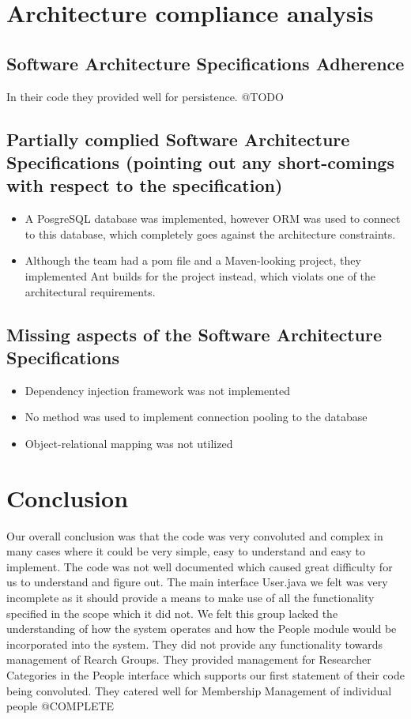 \documentclass{article}
\begin{document}
    


\section{Architecture compliance analysis}
	\subsection{Software Architecture Specifications Adherence}
	In their code they provided well for persistence.
	@TODO
	\subsection{Partially complied Software Architecture Specifications (pointing out any short-comings with respect to the specification)}
	\begin{itemize}
		\item A PosgreSQL database was implemented, however ORM was used to connect to this database, which completely goes against the architecture constraints.
		\item Although the team had a pom file and a Maven-looking project, they implemented Ant builds for the project instead, which violats one of the architectural requirements.
	\end{itemize}

	\subsection{Missing aspects of the Software Architecture Specifications}
	\begin{itemize}
		\item Dependency injection framework was not implemented
		\item No method was used to implement connection pooling to the database
		\item Object-relational mapping was not utilized

	\end{itemize}
	

\section{Conclusion}
Our overall conclusion was that the code was very convoluted and complex in many cases where it could be very simple, easy to understand and easy to implement. The code was not well documented which caused great difficulty for us to understand and figure out. The main interface User.java we felt was very incomplete as it should provide a means to make use of all the functionality specified in the scope which it did not. We felt this group lacked the understanding of how the system operates and how the People module would be incorporated into the system. They did not provide any functionality towards management of Rearch Groups. They provided management for Researcher Categories in the People interface which supports our first statement of their code being convoluted. They catered well for Membership Management of individual people
@COMPLETE
\end{document}
